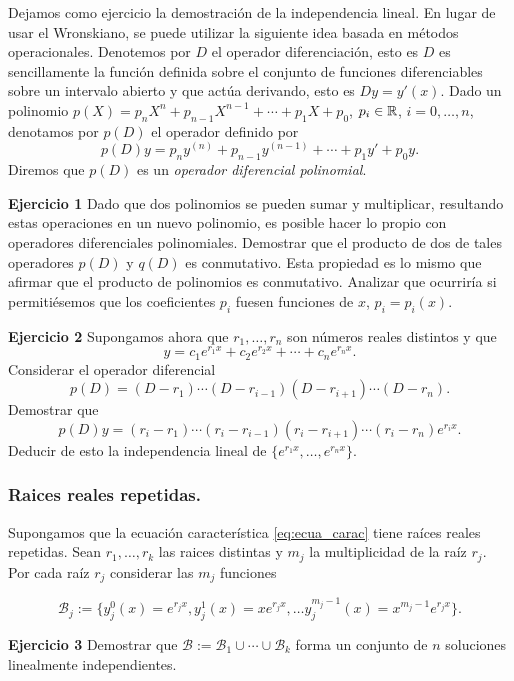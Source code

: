 Dejamos como ejercicio la demostración de la independencia lineal. En lugar de usar el Wronskiano, se puede utilizar  la siguiente idea basada en métodos operacionales. Denotemos por $D$  el operador diferenciación, esto es $D$ es sencillamente la función  definida sobre el conjunto de funciones diferenciables sobre un intervalo abierto y que actúa derivando, esto es $Dy=y'(x)$. Dado un polinomio $p(X)=p_nX^n+p_{n-1}X^{n-1}+\cdots+p_1X+p_0$, $p_i\in\rr$, $i=0,\ldots,n$, denotamos por  $p(D)$ el operador definido por
\[p(D)y=p_ny^{(n)}+p_{n-1}y^{(n-1)}+\cdots+p_1y'+p_0y.\]
Diremos que $p(D)$ es un \emph{operador diferencial polinomial}.

\noindent\textbf{Ejercicio 1} Dado que dos polinomios se pueden sumar y multiplicar, resultando estas operaciones en un nuevo polinomio, es posible hacer lo propio con operadores diferenciales polinomiales. Demostrar que el producto de dos de tales operadores  $p(D)$ y $q(D)$ es conmutativo. Esta propiedad es lo mismo que afirmar que el producto de polinomios es conmutativo. Analizar que ocurriría si permitiésemos que los coeficientes $p_i$ fuesen funciones de $x$, $p_i=p_i(x)$.


\noindent\textbf{Ejercicio 2} Supongamos ahora que $r_1,\ldots,r_n$ son números reales distintos y que
\[y=c_1e^{r_1x}+c_2e^{r_2x}+\cdots+c_ne^{r_nx}.\]
Considerar el operador diferencial
\[p(D)=(D-r_1)\cdots(D-r_{i-1})(D-r_{i+1})\cdots(D-r_n).\]
Demostrar que
\[p(D)y=(r_i-r_1)\cdots(r_i-r_{i-1})(r_i-r_{i+1})\cdots(r_i-r_n)e^{r_ix}.\]
Deducir de esto la independencia lineal de $\{e^{r_1x},\ldots,e^{r_nx}\}$.



\subsubsection{Raices reales repetidas.}
Supongamos que la ecuación característica \eqref{eq:ecua_carac} tiene  raíces reales repetidas. Sean $r_1,\ldots,r_k$ las raices distintas y $m_j$ la multiplicidad de la raíz $r_j$. Por cada raíz $r_j$ considerar las $m_j$  funciones

\[\mathcal{B}_j:=\{y_j^0(x)=e^{r_jx}, y_j^1(x)=xe^{r_jx},\ldots y_j^{m_j-1}(x)=x^{m_j-1}e^{r_jx}\}.\]

 \noindent\textbf{Ejercicio 3} Demostrar que $\mathcal{B}:=\mathcal{B}_1\cup\cdots\cup \mathcal{B}_k$ forma
 un conjunto de  $n$  soluciones linealmente independientes.

